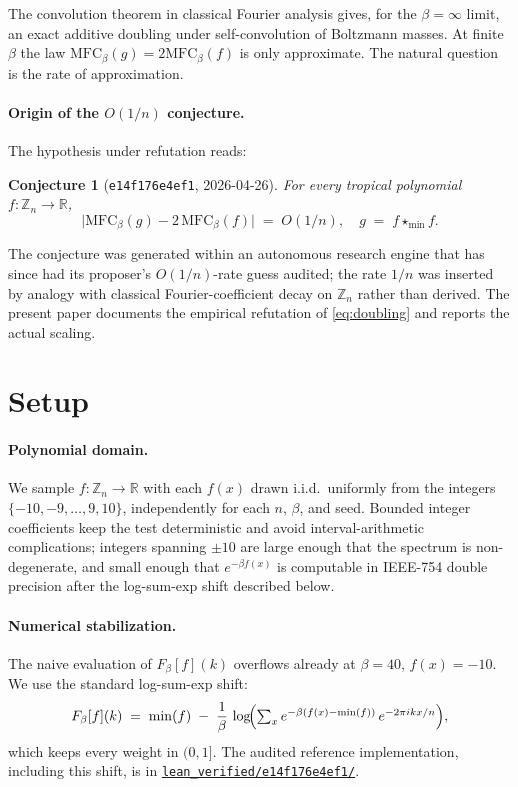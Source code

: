 \documentclass[11pt,a4paper]{article}
\newtheorem{conjecture}{Conjecture}
\begin{document}
The convolution theorem in classical Fourier analysis gives, for the
$\beta=\infty$ limit, an exact additive doubling under self-convolution
of Boltzmann masses. At finite $\beta$ the law $\mathrm{MFC}_\beta(g) = 2\mathrm{MFC}_\beta(f)$ is only
approximate. The natural question is the rate of approximation.

\paragraph{Origin of the $O(1/n)$ conjecture.}
The hypothesis under refutation reads:

\begin{conjecture}[\texttt{e14f176e4ef1}, 2026-04-26]\label{conj:original}
For every tropical polynomial $f \colon \mathbb{Z}_n \to \mathbb{R}$,
\begin{equation}\label{eq:doubling}
\bigl|\mathrm{MFC}_\beta(g) - 2\,\mathrm{MFC}_\beta(f)\bigr|
\;=\;
O(1/n),
\quad
g \;=\; f \star_{\min}\!f.
\end{equation}
\end{conjecture}

The conjecture was generated within an autonomous research engine that
has since had its proposer's $O(1/n)$-rate guess audited; the rate
$1/n$ was inserted by analogy with classical Fourier-coefficient decay
on $\mathbb{Z}_n$ rather than derived. The present paper documents the
empirical refutation of \eqref{eq:doubling} and reports the actual
scaling.

\section{Setup}\label{sec:setup}

\paragraph{Polynomial domain.}
We sample $f \colon \mathbb{Z}_n \to \mathbb{R}$ with each $f(x)$ drawn
i.i.d.\ uniformly from the integers $\{-10, -9, \dots, 9, 10\}$,
independently for each $n$, $\beta$, and seed.
Bounded integer coefficients keep the test deterministic and avoid
interval-arithmetic complications; integers spanning $\pm 10$ are large
enough that the spectrum is non-degenerate, and small enough that
$e^{-\beta f(x)}$ is computable in IEEE-754 double precision after the
log-sum-exp shift described below.

\paragraph{Numerical stabilization.}
The naive evaluation of $F_\beta[f](k)$ overflows already at
$\beta = 40$, $f(x) = -10$. We use the standard log-sum-exp shift:
\[
F_\beta[f](k)
\;=\;
\min(f) \;-\;
\frac{1}{\beta}\,\log\!\Bigl(\textstyle\sum_x e^{-\beta(f(x)-\min(f))}\,e^{-2\pi ikx/n}\Bigr),
\]
which keeps every weight in $(0,1]$. The audited reference implementation,
including this shift, is in
\href{https://github.com/ludwigkubler/SperimentalMath/blob/main/lean_verified/e14f176e4ef1/}{\texttt{lean\_verified/e14f176e4ef1/}}.
\end{document}
